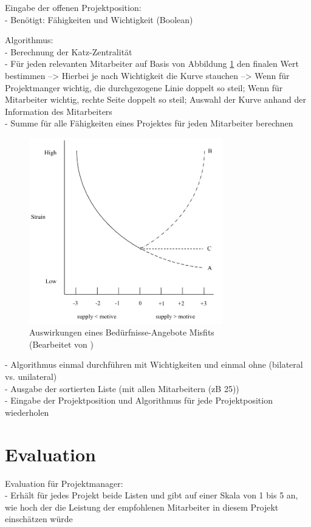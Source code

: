 Eingabe der offenen Projektposition:\\
- Benötigt: Fähigkeiten und Wichtigkeit (Boolean)

Algorithmus:\\
- Berechnung der Katz-Zentralität\\
- Für jeden relevanten Mitarbeiter auf Basis von Abbildung \ref{fig:methodik:abb2} den finalen Wert bestimmen --> Hierbei je nach Wichtigkeit die Kurve stauchen --> Wenn für Projektmanger wichtig, die durchgezogene Linie doppelt so steil; Wenn für Mitarbeiter wichtig, rechte Seite doppelt so steil; Auswahl der Kurve anhand der Information des Mitarbeiters\\
- Summe für alle Fähigkeiten eines Projektes für jeden Mitarbeiter berechnen

\begin{figure}[h]
	\centering
	\includegraphics[width=0.75\textwidth]{gfx/ueberschuss_supply_motive.png}
	\caption{Auswirkungen eines Bedürfnisse-Angebote Misfits \cite[S. 23]{edwards:2008}\\(Bearbeitet von \myName)}
	\label{fig:methodik:abb2}
\end{figure}

- Algorithmus einmal durchführen mit Wichtigkeiten und einmal ohne (bilateral vs. unilateral)\\
- Ausgabe der sortierten Liste (mit allen Mitarbeitern (zB 25))\\
- Eingabe der Projektposition und Algorithmus für jede Projektposition wiederholen

\section{Evaluation}
\label{ch:methodik:evaluation}
Evaluation für Projektmanager:\\
- Erhält für jedes Projekt beide Listen und gibt auf einer Skala von 1 bis 5 an, wie hoch der die Leistung der empfohlenen Mitarbeiter in diesem Projekt einschätzen würde

